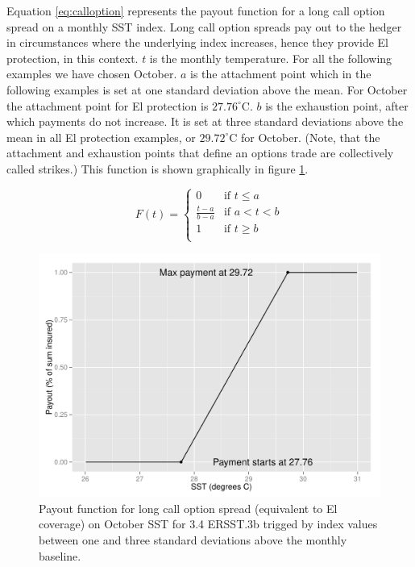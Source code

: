\documentclass[article]{jss}
\begin{document}
Equation \ref{eq:calloption} represents the payout function for a long
call option spread on a monthly SST index. Long call option spreads pay
out to the hedger in circumstances where the underlying index increases,
hence they provide El  protection, in this context. \(t\)
is the monthly temperature. For all the following examples we have
chosen October. \(a\) is the attachment point which in the following
examples is set at one standard deviation above the mean. For October
the attachment point for El  protection is
\(27.76^{\circ}\mathrm{C}\). \(b\) is the exhaustion point, after which
payments do not increase. It is set at three standard deviations above
the mean in all El  protection examples, or
\(29.72^{\circ}\mathrm{C}\) for October. (Note, that the attachment and
exhaustion points that define an options trade are collectively called
strikes.) This function is shown graphically in figure
\ref{fig:payouyt10callex}.

\begin{equation}
 F(t)=\left \{ \begin{array} {ll}
0 & \text{if} \,\, t \le a \\
\frac{t-a}{b-a} & \text{if} \,\, a<t<b\\
1 & \text{if} \,\, t \ge b\\
\end{array} \right.
\label{eq:calloption}
\end{equation}

\begin{figure}[!htbp]
  \includegraphics[width=\linewidth]{img/payoutExamplemonth10contractType1.pdf}
  \caption{Payout function for long call option spread (equivalent to El  coverage) on October SST for  3.4 ERSST.3b trigged by index values between one and three standard deviations above the monthly baseline.}
   \label{fig:payouyt10callex}
\end{figure}
\end{document}
